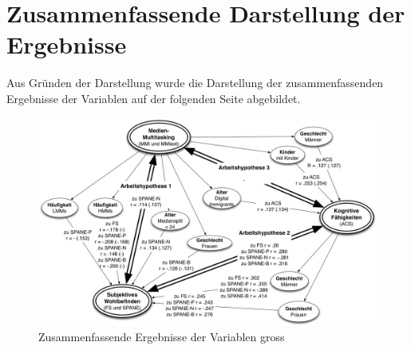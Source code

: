 %
%
\glsresetall

\let\raggedsection\centering 
\chapter{Zusammenfassende Darstellung der Ergebnisse}\label{anhang.zusammenfassendeDarstellung}
\let\raggedsection\raggedright 
\begin{RaggedRight}
Aus Gründen der Darstellung wurde die Darstellung der zusammenfassenden Ergebnisse der Variablen auf der folgenden Seite abgebildet.
\begin{figure}[h]
    \centering
    \includegraphics[scale=0.5, angle=90]{images/grafiken/Zusammenhang_Zusammenfassung_v2.jpg}
     \caption{Zusammenfassende Ergebnisse der Variablen gross}
     \label{pic.ergebniss.zusammenfassungGross}
\end{figure}

\end{RaggedRight}
